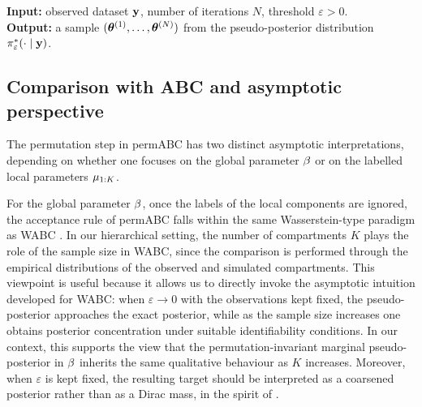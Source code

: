 \begin{algorithm}
{\small
{}
\caption{permABC Vanilla}\label{alg:permABC_star}
\textbf{Input: }observed dataset $\mathbf{y}$, number of iterations $N$, threshold $\varepsilon>0$.\\
\textbf{Output: }a sample $(\boldsymbol{\theta}^{(1)}, \dots, \boldsymbol{\theta}^{(N)})$ from the pseudo-posterior distribution $\pi_{\varepsilon}^*(\cdot\mid \mathbf{y})$.\\

\BlankLine

}%
\end{algorithm}

\subsection{Comparison with ABC and asymptotic perspective}
\label{sec:comparison}

The permutation step in permABC has two distinct asymptotic interpretations, depending on whether one focuses on the global parameter \(\beta\) or on the labelled local parameters \(\mu_{1:K}\).

For the global parameter \(\beta\), once the labels of the local components are ignored, the acceptance rule of permABC falls within the same Wasserstein-type paradigm as WABC \citep{bernton2019approximate}. In our hierarchical setting, the number of compartments \(K\) plays the role of the sample size in WABC, since the comparison is performed through the empirical distributions of the observed and simulated compartments. This viewpoint is useful because it allows us to directly invoke the asymptotic intuition developed for WABC: when \(\varepsilon \to 0\) with the observations kept fixed, the pseudo-posterior approaches the exact posterior, while as the sample size increases one obtains posterior concentration under suitable identifiability conditions. In our context, this supports the view that the permutation-invariant marginal pseudo-posterior in \(\beta\) inherits the same qualitative behaviour as \(K\) increases. Moreover, when \(\varepsilon\) is kept fixed, the resulting target should be interpreted as a coarsened posterior rather than as a Dirac mass, in the spirit of \citet{miller2019robust}. 

